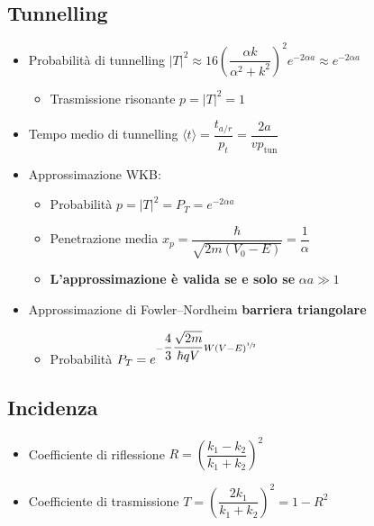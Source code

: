 \documentclass{article}
\begin{document}
\newpage

\subsection{Tunnelling}
\begin{itemize}
  \item Probabilità di tunnelling \( \left| T \right| ^ 2 \approx 16 \left( \dfrac{\alpha k}{\alpha^2 + k^2} \right) ^ 2  e^{  -2 \alpha a  } \approx e^{-2 \alpha a} \)
        \begin{itemize}
          \item Trasmissione risonante \( p = |  T | ^ 2 = 1 \)
        \end{itemize}
  \item Tempo medio di tunnelling \( \langle t \rangle = \dfrac{t_{a/r}}{p_t} = \dfrac{2 a}{v p_{\text{tun}}} \)
  \item Approssimazione WKB:
        \begin{itemize}
          \item Probabilità \( p = \left| T \right| ^ 2 = P_T = e^{-2 \alpha a  } \)
          \item Penetrazione media \( x_p = \dfrac{\hbar}{\sqrt{2 m (V_0 - E)}} = \dfrac{1}{\alpha} \)
          \item \textbf{L'approssimazione è valida se e solo se} \( \alpha a \gg 1 \)
        \end{itemize}
  \item Approssimazione di Fowler–Nordheim \textbf{barriera triangolare}
        \begin{itemize}
          \item Probabilità \( P_T = e^{ - \dfrac{4}{3} \dfrac{\sqrt{2m}}{\hbar q V} W (V - E) ^ {\sfrac{3}{2}} } \)
        \end{itemize}
\end{itemize}

\subsection{Incidenza}
\begin{itemize}
  \item Coefficiente di riflessione \( R = \left( \dfrac{k_1 - k_2}{k_1 + k_2} \right) ^ 2 \)
  \item Coefficiente di trasmissione \( T = \left( \dfrac{2 k_1}{k_1 + k_2} \right) ^ 2 = 1 - R ^ 2 \)
\end{itemize}

\newpage
\end{document}
